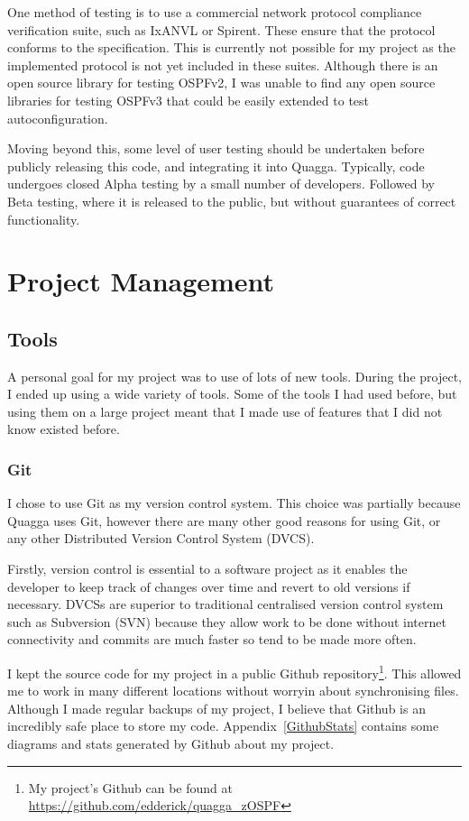 \documentclass[12pt]{report}
\begin{document}
One method of testing is to use a commercial network protocol compliance
verification suite, such as IxANVL or Spirent. These ensure that the protocol
conforms to the specification. This is currently not possible for my project as
the implemented protocol is not yet included in these suites.  Although there
is an open source library for testing OSPFv2, I was unable to find any open
source libraries for testing OSPFv3 that could be easily extended to test
autoconfiguration. 

Moving beyond this, some level of user testing should be undertaken before
publicly releasing this code, and integrating it into Quagga. Typically, code
undergoes closed Alpha testing by a small number of developers. Followed by
Beta testing, where it is released to the public, but without guarantees of
correct functionality.

\chapter{Project Management}

\section{Tools}
A personal goal for my project was to use of lots of new tools. During the
project, I ended up using a wide variety of tools. Some of the tools I had used
before, but using them on a large project meant that I made use of features that
I did not know existed before.

\subsection{Git}
I chose to use Git as my version control system. This choice was
partially because Quagga uses Git, however there are many other good reasons for
using Git, or any other Distributed Version Control System (DVCS).

Firstly, version control is essential to a software project as it enables the
developer to keep track of changes over time and revert to old versions if
necessary.  DVCSs are superior to traditional centralised version control
system such as Subversion (SVN) because they allow work to be done without internet
connectivity and commits are much faster so tend to be made more often. 

I kept the source code for my project in a public Github repository\footnote{My
project's Github can be found at
\url{https://github.com/edderick/quagga\_zOSPF}}. This allowed me to work in
many different locations without worryin about synchronising files. Although
I made regular backups of my project, I believe that Github is an incredibly
safe place to store my code. Appendix~\ref{GithubStats} contains some
diagrams and stats generated by Github about my project. 
\end{document}
